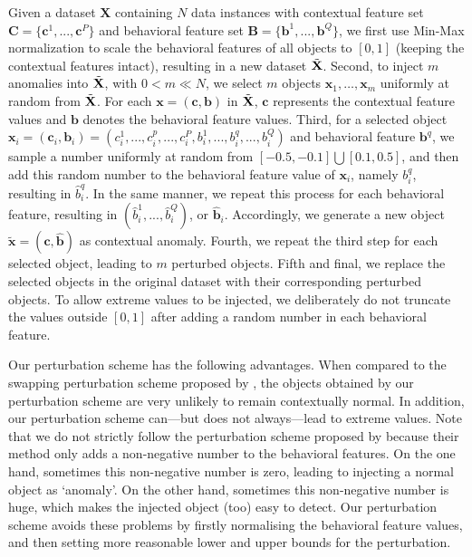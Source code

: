 \documentclass[pdflatex,sn-basic]{sn-jnl}%
\theoremstyle{thmstyleone}%
\theoremstyle{thmstyletwo}%
\theoremstyle{thmstylethree}%
\begin{document}
Given a dataset $\mathbf{X}$ containing $N$ data instances with contextual feature set $\mathbf{C} = \{\mathbf{c}^{1},...,\mathbf{c}^{P}\}$ and behavioral feature set $\mathbf{B} = \{\mathbf{b}^{1},...,\mathbf{b}^{Q}\}$, we first use Min-Max normalization to scale the behavioral features of all objects to $[0,1]$ (keeping the contextual features intact), resulting in a new dataset $\Tilde{\mathbf{X}}$. Second, to inject $m$ anomalies into $\Tilde{\mathbf{X}}$, with $0<m \ll N$, we select $m$ objects $\mathbf{x}_{1},\ldots,\mathbf{x}_{m}$ uniformly at random from $\Tilde{\mathbf{X}}$. For each $\mathbf{x} =(\mathbf{c},\mathbf{b})$ in $\Tilde{\mathbf{X}}$, $\mathbf{c}$ represents the contextual feature values and  $\mathbf{b}$ denotes the behavioral feature values. Third, for a selected object $\mathbf{x}_{i} = (\mathbf{c}_{i}, \mathbf{b}_{i})= (c^{1}_{i},...,c^{p}_{i},...,c^{P}_{i},b^{1}_{i},...,b^{q}_{i},...,b^{Q}_{i})$ and behavioral feature $\mathbf{b}^{q}$, we sample a number uniformly at random from $[-0.5,-0.1] \bigcup [0.1,0.5]$, and then add this random number to the behavioral feature value of $\mathbf{x}_{i}$, namely $b^{q}_{i}$, resulting in $\hat{b}^{q}_{i}$. In the same manner, we repeat this process for each behavioral feature, resulting in $(\hat{b}^{1}_{i},...,\hat{b}^{Q}_{i})$, or $\hat{\mathbf{b}}_{i}$. Accordingly, we generate a new object
$\tilde{\mathbf{x}} = (\mathbf{c}, \hat{\mathbf{b}})$ as contextual anomaly. Fourth, we repeat the third step for each selected object, leading to $m$ perturbed objects.
Fifth and final, we replace the selected objects in the original dataset with their corresponding perturbed objects. To allow extreme values to be injected, we deliberately do not truncate the values outside $[0,1]$ after adding a random number in each behavioral feature.

Our perturbation scheme has the following advantages. When compared to the swapping perturbation scheme proposed by \cite{song2007conditional}, the objects obtained by our perturbation scheme  are very unlikely to remain contextually normal. In addition, our perturbation scheme can---but does not always---lead to extreme values. Note that we do not strictly follow the perturbation scheme proposed by \cite{kuo2018detecting} because their method only adds a non-negative number to the behavioral features. On the one hand, sometimes this non-negative number is zero, leading to injecting a normal object as `anomaly'. On the other hand, sometimes this non-negative number is huge, which makes the injected object (too) easy to detect. Our perturbation scheme avoids these problems by firstly normalising the behavioral feature values, and then setting more reasonable lower and upper bounds for the perturbation. 
\end{document}
